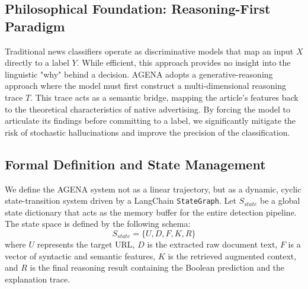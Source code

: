 \documentclass{ieeeaccess}
\begin{document}
\subsection{Philosophical Foundation: Reasoning-First Paradigm}
Traditional news classifiers operate as discriminative models that map an input $X$ directly to a label $Y$. While efficient, this approach provides no insight into the linguistic "why" behind a decision. AGENA adopts a generative-reasoning approach where the model must first construct a multi-dimensional reasoning trace $T$. This trace acts as a semantic bridge, mapping the article's features back to the theoretical characteristics of native advertising. By forcing the model to articulate its findings before committing to a label, we significantly mitigate the risk of stochastic hallucinations and improve the precision of the classification.

\subsection{Formal Definition and State Management}
We define the AGENA system not as a linear trajectory, but as a dynamic, cyclic state-transition system driven by a LangChain \texttt{StateGraph}. Let $S_{state}$ be a global state dictionary that acts as the memory buffer for the entire detection pipeline. The state space is defined by the following schema:
\begin{equation}
S_{state} = \{U, D, F, K, R\}
\end{equation}
where $U$ represents the target URL, $D$ is the extracted raw document text, $F$ is a vector of syntactic and semantic features, $K$ is the retrieved augmented context, and $R$ is the final reasoning result containing the Boolean prediction and the explanation trace.
\end{document}
